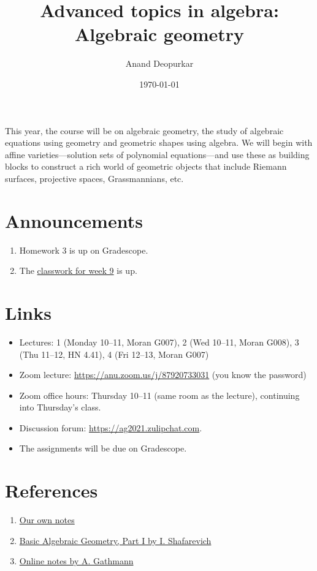 \documentclass[11pt]{article}
\author{Anand Deopurkar}
\date{\today}
\title{Advanced topics in algebra: Algebraic geometry}
\begin{document}
\maketitle
This year, the course will be on algebraic geometry, the study of algebraic equations using geometry and geometric shapes using algebra.
We will begin with affine varieties---solution sets of polynomial equations---and use these as building blocks to construct a rich world of geometric objects that include Riemann surfaces, projective spaces, Grassmannians, etc.

\section{Announcements}
\label{sec:orgd00a6ab}
\begin{enumerate}
\item Homework 3 is up on Gradescope.
\item The \href{classwork09.pdf}{classwork for week 9} is up.
\end{enumerate}

\section{Links}
\label{sec:org5370edf}
\begin{itemize}
\item Lectures: 1 (Monday 10--11, Moran G007), 2 (Wed 10--11, Moran G008), 3 (Thu 11--12, HN 4.41), 4 (Fri 12--13, Moran G007)
\item Zoom lecture: \url{https://anu.zoom.us/j/87920733031} (you know the password)
\item Zoom office hours: Thursday 10--11 (same room as the lecture), continuing into Thursday's class.
\item Discussion forum: \url{https://ag2021.zulipchat.com}.
\item The assignments will be due on Gradescope.
\end{itemize}

\section{References}
\label{sec:orgd1314c0}
\begin{enumerate}
\item \href{notes}{Our own notes}
\item \href{https://link.springer.com/book/10.1007/978-3-642-37956-7}{Basic Algebraic Geometry, Part I by I. Shafarevich}
\item \href{https://www.mathematik.uni-kl.de/\~gathmann/class/alggeom-2002/alggeom-2002.pdf}{Online notes by A. Gathmann}
\end{enumerate}
\end{document}
